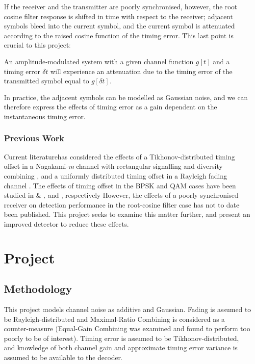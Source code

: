 If the receiver and the transmitter are poorly synchronised, however,
the root cosine filter response is shifted in time with respect to the
receiver; adjacent symbols bleed into the current symbol, and the current symbol is attenuated according to the raised cosine function of the timing error. This last point is crucial to this project:

\begin{propo}
An amplitude-modulated system with a given channel function $g[t]$ and a timing error $\delta t$ will experience an attenuation due to the timing error of the transmitted symbol equal to $g[\delta t]$.
\end{propo}

In practice, the adjacent symbols can be modelled as Gaussian noise, and we can therefore express the effects of timing error as a gain dependent on the instantaneous timing error. 

\section{Previous Work}

Current literaturehas considered the effects of a Tikhonov-distributed timing offset in a Nagakami-\emph{m} channel with rectangular signalling and diversity combining \cite{[2]}, and a uniformly distributed timing offset in a Rayleigh fading channel \cite{[6]}. The effects of timing offset in the BPSK and QAM cases have been studied in \cite{[3]} \& \cite{[4]}, and \cite{[5]}, respectively However, the effects of a poorly synchronised receiver on detection performance in the root-cosine filter case has not to date been published. This project seeks to examine this matter further, and present an improved detector to reduce these effects.

\part{Project}

\chapter{Methodology}

This project models channel noise as additive and Gaussian. Fading is assumed to be Rayleigh-distributed and Maximal-Ratio Combining is considered as a counter-measure (Equal-Gain Combining was examined and found to perform too poorly to be of interest). Timing error is assumed to be Tikhonov-distributed, and knowledge of both channel gain and approximate timing error variance is assumed to be available to the decoder.

